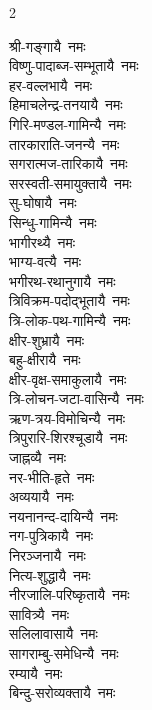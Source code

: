 \begin{multicols}{2}
\begin{flushleft}
श्री-गङ्गायै~नमः\\
विष्णु-पादाब्ज-सम्भूतायै~नमः\\
हर-वल्लभायै~नमः\\
हिमाचलेन्द्र-तनयायै~नमः\\
गिरि-मण्डल-गामिन्यै~नमः\\
तारकाराति-जनन्यै~नमः\\
सगरात्मज-तारिकायै~नमः\\
सरस्वती-समायुक्तायै~नमः\\
सु-घोषायै~नमः\\
सिन्धु-गामिन्यै~नमः\hfill{}\\
भागीरथ्यै~नमः\\
भाग्य-वत्यै~नमः\\
भगीरथ-रथानुगायै~नमः\\
त्रिविक्रम-पदोद्भूतायै~नमः\\
त्रि-लोक-पथ-गामिन्यै~नमः\\
क्षीर-शुभ्रायै~नमः\\
बहु-क्षीरायै~नमः\\
क्षीर-वृक्ष-समाकुलायै~नमः\\
त्रि-लोचन-जटा-वासिन्यै~नमः\\
ऋण-त्रय-विमोचिन्यै~नमः\hfill{}\\
त्रिपुरारि-शिरश्चूडायै~नमः\\
जाह्नव्यै~नमः\\
नर-भीति-हृते~नमः\\
अव्ययायै~नमः\\
नयनानन्द-दायिन्यै~नमः\\
नग-पुत्रिकायै~नमः\\
निरञ्जनायै~नमः\\
नित्य-शुद्धायै~नमः\\
नीरजालि-परिष्कृतायै~नमः\\
सावित्र्यै~नमः\hfill{}\\
सलिलावासायै~नमः\\
सागराम्बु-समेधिन्यै~नमः\\
रम्यायै~नमः\\
बिन्दु-सरोव्यक्तायै~नमः\\

\end{flushleft}
\end{multicols}
